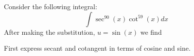 \documentclass{ximera}
\author{Bart Snapp}
\begin{document}
\begin{exercise}
  Consider the following integral:
  \[
  \int \sec^{90}(x) \cot^{59}(x)  dx
  \]
  After making the substitution, $u = \sin(x)$ we find
  \begin{hint}
    First express secant and cotangent in terms of cosine and sine.
  \end{hint}
  \begin{multipleChoice}
  \end{multipleChoice}
\end{exercise}
\end{document}
